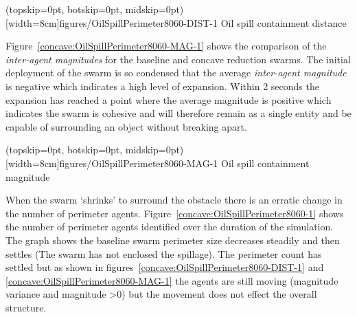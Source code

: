\documentclass{ieeeaccess}
\begin{document}
\Figure[t!](topskip=0pt, botskip=0pt, midskip=0pt)[width=8cm]{figures/OilSpillPerimeter8060-DIST-1}
{Oil spill containment distance\label{concave:OilSpillPerimeter8060-DIST-1}}


Figure~\ref{concave:OilSpillPerimeter8060-MAG-1} shows the comparison of the \textit{inter-agent magnitudes} for the baseline and concave reduction swarms. The initial deployment of the swarm is so condensed that the average \textit{inter-agent magnitude} is negative which indicates a high level of expansion. Within 2 seconds the expansion has reached a point where the average magnitude is positive which indicates the swarm is cohesive and will therefore remain as a single entity and be capable of surrounding an object without breaking apart.

\Figure[t!](topskip=0pt, botskip=0pt, midskip=0pt)[width=8cm]{figures/OilSpillPerimeter8060-MAG-1}
{Oil spill containment magnitude\label{concave:OilSpillPerimeter8060-MAG-1}}


When the swarm `shrinks' to surround the obstacle there is an erratic change in the number of perimeter agents. Figure~\ref{concave:OilSpillPerimeter8060-1} shows the number of perimeter agents identified over the duration of the simulation. The graph shows the baseline swarm perimeter size decreases steadily and then settles (The swarm has not enclosed the spillage). The perimeter count has settled but as shown in figures~\ref{concave:OilSpillPerimeter8060-DIST-1} and \ref{concave:OilSpillPerimeter8060-MAG-1} the agents are still moving (magnitude variance and magnitude \textgreater 0) but the movement does not effect the overall structure. 
\end{document}
